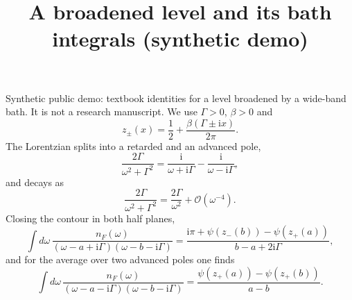 \documentclass{article}
\title{A broadened level and its bath integrals (synthetic demo)}
\newcommand{\ii}{\mathrm{i}}
\newcommand{\Lor}[1]{\frac{2\Gamma}{#1^2+\Gamma^2}}
\begin{document}
Synthetic public demo: textbook identities for a level broadened by a
wide-band bath. It is not a research manuscript. We use $\Gamma>0$,
$\beta>0$ and
\begin{equation}
\label{eq:zdef}
z_\pm(x) = \frac12 + \frac{\beta(\Gamma \pm \ii x)}{2\pi} .
\end{equation}
The Lorentzian splits into a retarded and an advanced pole,
\begin{equation}
\label{eq:split}
\Lor{\omega} = \frac{\ii}{\omega + \ii\Gamma} - \frac{\ii}{\omega - \ii\Gamma},
\end{equation}
and decays as
\begin{equation}
\label{eq:tail}
\Lor{\omega} = \frac{2\Gamma}{\omega^2} + \mathcal{O}(\omega^{-4}) .
\end{equation}
Closing the contour in both half planes,
\begin{equation}
\label{eq:pair}
\int d\omega\, \frac{n_F(\omega)}{(\omega - a + \ii\Gamma)(\omega - b - \ii\Gamma)}
 = \frac{\ii\pi + \psi(z_-(b)) - \psi(z_+(a))}{b - a + 2\ii\Gamma},
\end{equation}
and for the average over two advanced poles one finds
\begin{equation}
\label{eq:pair-wrong}
\int d\omega\, \frac{n_F(\omega)}{(\omega - a - \ii\Gamma)(\omega - b - \ii\Gamma)}
 = \frac{\psi(z_+(a)) - \psi(z_+(b))}{a - b} .
\end{equation}
\end{document}

